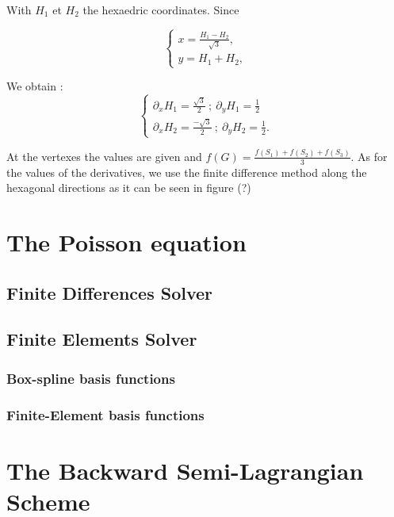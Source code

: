 \documentclass[proc]{edpsmath}
\begin{document}
With $H_1$ et $H_2$ the  hexaedric coordinates. Since   

\begin{equation}
\begin{cases}  

\displaystyle{x = \frac{ H_1 - H_2 }{\sqrt{3}} },  \\[2mm]
\displaystyle{y =  H_1 + H_2 },        

\end{cases}
\end{equation}

We obtain :
\begin{equation}
	\begin{cases}  
       \displaystyle{  \partial _x H_1 = \frac{\sqrt{3}}{ 2} ~;~  \partial _y H_1 = \frac{1}{ 2}  }\\[2mm]
       \displaystyle{  \partial _x H_2 = \frac{-\sqrt{3}}{2} ~;~  \partial _y H_2 = \frac{1}{ 2}  } . 
\end{cases}	
\end{equation}

At the vertexes the values are given and $f(G) = \frac{f(S_1)+f(S_2)+f(S_3)}{3}$. As for the values of the derivatives, we use the finite difference method along the hexagonal directions as it can be seen in figure (?)

\section{The Poisson equation}
\subsection{Finite Differences Solver}
\subsection{Finite Elements Solver}
\subsubsection{Box-spline basis functions}
\subsubsection{Finite-Element basis functions}

\section{The Backward Semi-Lagrangian Scheme}
\end{document}
